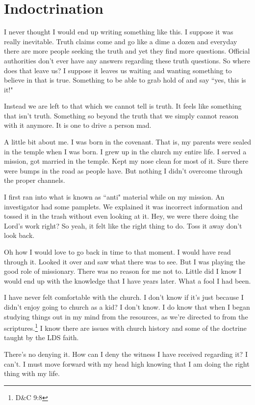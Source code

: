 \section{Indoctrination}

I never thought I would end up writing something like this. I suppose it was
really inevitable. Truth claims come and go like a dime a dozen and everyday
there are more people seeking the truth and yet they find more questions.
Official authorities don't ever have any answers regarding these truth
questions. So where does that leave us? I suppose it leaves us waiting and
wanting something to believe in that is true. Something to be able to grab hold
of and say ``yes, this is it!"

Instead we are left to that which we cannot tell is truth. It feels like
something that isn't truth. Something so beyond the truth that we simply cannot
reason with it anymore. It is one to drive a person mad.

A little bit about me. I was born in the covenant. That is, my parents were
sealed in the temple when I was born. I grew up in the church  my entire life. I
served a mission, got married in the temple. Kept my nose clean for most of it.
Sure there were bumps in the road as people have. But nothing I didn't overcome
through the proper channels.

I first ran into what is known as ``anti" material while on my mission. An
investigator had some pamplets. We explained it was incorrect information and
tossed it in the trash without even looking at it. Hey, we were there doing the
Lord's work right? So yeah, it felt like the right thing to do. Toss it away
don't look back.

Oh how I would love to go back in time to that moment. I would have read through
it. Looked it over and saw what there was to see. But I was playing the good
role of missionary. There was no reason for me not to. Little did I know I would
end up with the knowledge that I have years later. What a fool I had been.

I have never felt comfortable with the church. I don't know if it's just because
I didn't enjoy going to church as a kid? I don't know. I do know that when I
began studying things out in my mind from the resources, as we're directed to
from the scriptures.\footnote{D\&C 9:8} I know there are issues with church 
history and some of the doctrine taught by the LDS faith.

There's no denying it. How can I deny the witness I have received regarding it?
I can't. I must move forward with my head high knowing that I am doing the right
thing with my life.

